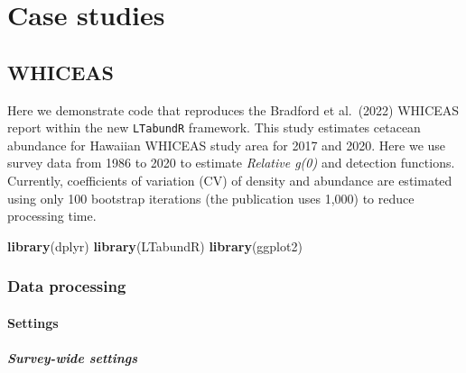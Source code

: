 \documentclass[
]{book}
\newenvironment{Shaded}{\begin{snugshade}}{\end{snugshade}}
\newcommand{\KeywordTok}[1]{\textcolor[rgb]{0.13,0.29,0.53}{\textbf{#1}}}
\newcommand{\NormalTok}[1]{#1}
\begin{document}
\hypertarget{part-case-studies}{%
\part{Case studies}\label{part-case-studies}}

\hypertarget{whiceas}{%
\chapter{WHICEAS}\label{whiceas}}

Here we demonstrate code that reproduces the Bradford et al.~(2022) WHICEAS report within the new \texttt{LTabundR} framework. This study estimates cetacean abundance for Hawaiian WHICEAS study area for 2017 and 2020. Here we use survey data from 1986 to 2020 to estimate \emph{Relative g(0)} and detection functions. Currently, coefficients of variation (CV) of density and abundance are estimated using only 100 bootstrap iterations (the publication uses 1,000) to reduce processing time.

\begin{Shaded}
\begin{Highlighting}[]
\KeywordTok{library}\NormalTok{(dplyr)}
\KeywordTok{library}\NormalTok{(LTabundR)}
\KeywordTok{library}\NormalTok{(ggplot2)}
\end{Highlighting}
\end{Shaded}

\hypertarget{data-processing}{%
\section*{Data processing}\label{data-processing}}

\hypertarget{settings-1}{%
\subsection*{Settings}\label{settings-1}}

\hypertarget{survey-wide-settings-2}{%
\subsubsection*{Survey-wide settings}\label{survey-wide-settings-2}}
\end{document}
